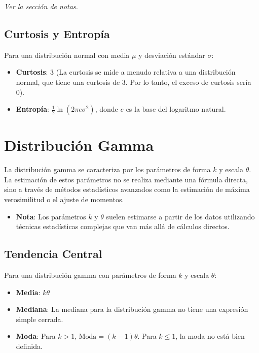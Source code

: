 \documentclass[11pt]{article}
\begin{document}
\textit{Ver la sección de notas.}

\subsection*{Curtosis y Entropía}
Para una distribución normal con media \(\mu\) y desviación estándar \(\sigma\):
\begin{itemize}
	\item \textbf{Curtosis}: 3 (La curtosis se mide a menudo relativa a una distribución normal, que tiene una curtosis de 3. Por lo tanto, el exceso de curtosis sería 0).
	\item \textbf{Entropía}: \(\frac{1}{2} \ln(2 \pi e \sigma^2)\), donde \(e\) es la base del logaritmo natural.
\end{itemize}



\section*{Distribución Gamma}
La distribución gamma se caracteriza por los parámetros de forma \(k\) y escala \(\theta\). La estimación de estos parámetros no se realiza mediante una fórmula directa, sino a través de métodos estadísticos avanzados como la estimación de máxima verosimilitud o el ajuste de momentos.
\begin{itemize}
	\item \textbf{Nota}: Los parámetros \(k\) y \(\theta\) suelen estimarse a partir de los datos utilizando técnicas estadísticas complejas que van más allá de cálculos directos.
\end{itemize}

\subsection*{Tendencia Central}
Para una distribución gamma con parámetros de forma \(k\) y escala \(\theta\):
\begin{itemize}
	\item \textbf{Media}: \(k\theta\)
	\item \textbf{Mediana}: La mediana para la distribución gamma no tiene una expresión simple cerrada.
	\item \textbf{Moda}: Para \(k > 1\), \(\text{Moda} = (k - 1)\theta\). Para \(k \leq 1\), la moda no está bien definida.
\end{itemize}
\end{document}
